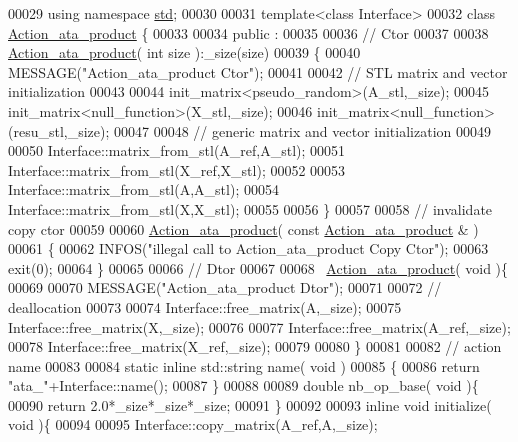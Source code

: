 \begin{DoxyCode}
00029 \textcolor{keyword}{using namespace }\hyperlink{namespacestd}{std};
00030 
00031 \textcolor{keyword}{template}<\textcolor{keyword}{class} Interface>
00032 \textcolor{keyword}{class }\hyperlink{class_action__ata__product}{Action\_ata\_product} \{
00033 
00034 public :
00035 
00036   \textcolor{comment}{// Ctor}
00037 
00038   \hyperlink{class_action__ata__product}{Action\_ata\_product}( \textcolor{keywordtype}{int} size ):\_size(size)
00039   \{
00040     MESSAGE(\textcolor{stringliteral}{"Action\_ata\_product Ctor"});
00041 
00042     \textcolor{comment}{// STL matrix and vector initialization}
00043 
00044     init\_matrix<pseudo\_random>(A\_stl,\_size);
00045     init\_matrix<null\_function>(X\_stl,\_size);
00046     init\_matrix<null\_function>(resu\_stl,\_size);
00047 
00048     \textcolor{comment}{// generic matrix and vector initialization}
00049 
00050     Interface::matrix\_from\_stl(A\_ref,A\_stl);
00051     Interface::matrix\_from\_stl(X\_ref,X\_stl);
00052 
00053     Interface::matrix\_from\_stl(A,A\_stl);
00054     Interface::matrix\_from\_stl(X,X\_stl);
00055 
00056   \}
00057 
00058   \textcolor{comment}{// invalidate copy ctor}
00059 
00060   \hyperlink{class_action__ata__product}{Action\_ata\_product}( \textcolor{keyword}{const}  \hyperlink{class_action__ata__product}{Action\_ata\_product} & )
00061   \{
00062     INFOS(\textcolor{stringliteral}{"illegal call to Action\_ata\_product Copy Ctor"});
00063     exit(0);
00064   \}
00065 
00066   \textcolor{comment}{// Dtor}
00067 
00068   ~\hyperlink{class_action__ata__product}{Action\_ata\_product}( \textcolor{keywordtype}{void} )\{
00069 
00070     MESSAGE(\textcolor{stringliteral}{"Action\_ata\_product Dtor"});
00071 
00072     \textcolor{comment}{// deallocation}
00073 
00074     Interface::free\_matrix(A,\_size);
00075     Interface::free\_matrix(X,\_size);
00076 
00077     Interface::free\_matrix(A\_ref,\_size);
00078     Interface::free\_matrix(X\_ref,\_size);
00079 
00080   \}
00081 
00082   \textcolor{comment}{// action name}
00083 
00084   \textcolor{keyword}{static} \textcolor{keyword}{inline} std::string name( \textcolor{keywordtype}{void} )
00085   \{
00086     \textcolor{keywordflow}{return} \textcolor{stringliteral}{"ata\_"}+Interface::name();
00087   \}
00088 
00089   \textcolor{keywordtype}{double} nb\_op\_base( \textcolor{keywordtype}{void} )\{
00090     \textcolor{keywordflow}{return} 2.0*\_size*\_size*\_size;
00091   \}
00092 
00093   \textcolor{keyword}{inline} \textcolor{keywordtype}{void} initialize( \textcolor{keywordtype}{void} )\{
00094 
00095     Interface::copy\_matrix(A\_ref,A,\_size);

\end{DoxyCode}
